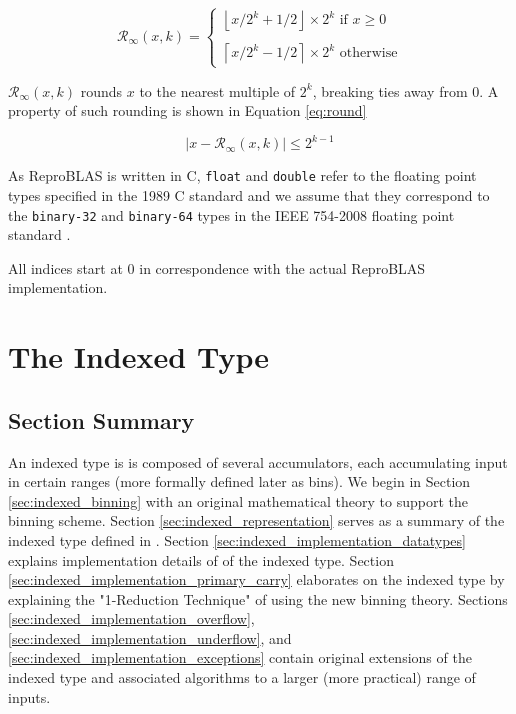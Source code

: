 \documentclass[12pt]{article}
\providecommand{\ceil}[1]{\left \lceil #1 \right \rceil }
\providecommand{\floor}[1]{\left \lfloor #1 \right \rfloor }
\providecommand{\roundtonearestinfty}{\ensuremath{\mathcal{R}_\text{$\infty$}}}
\theoremstyle{plain}
\numberwithin{equation}{section}
\begin{document}
  \begin{equation}
    \roundtonearestinfty(x, k) = \begin{cases}\floor{x/2^k + 1/2} \times 2^k \text{ if } x \geq 0\\ \\ \ceil{x/2^k - 1/2}\times 2^k \text{ otherwise}\end{cases}
  \end{equation}

  $\roundtonearestinfty(x, k)$ rounds $x$ to the nearest multiple of $2^k$, breaking ties away from 0. A property of such rounding is shown in Equation \ref{eq:round}

  \begin{equation}
    |x - \roundtonearestinfty(x, k)| \leq 2^{k - 1}
    \label{eq:round}
  \end{equation}

  As ReproBLAS is written in C, \verb|float| and \verb|double| refer to the floating point types specified in the 1989 C standard \cite{c89} and we assume that they correspond to the \verb|binary-32| and \verb|binary-64| types in the IEEE 754-2008 floating point standard \cite{ieee754}.

  All indices start at $0$ in correspondence with the actual ReproBLAS implementation.
\section{The Indexed Type}
  \subsection{Section Summary}
    An indexed type is is composed of several accumulators, each accumulating input in certain ranges (more formally defined later as bins). We begin in Section \ref{sec:indexed_binning} with an original mathematical theory to support the binning scheme. Section \ref{sec:indexed_representation} serves as a summary of the indexed type defined in \cite{repsum}.
    Section \ref{sec:indexed_implementation_datatypes} explains implementation details of \cite{repsum} of the indexed type. Section \ref{sec:indexed_implementation_primary_carry} elaborates on the indexed type by explaining the "1-Reduction Technique" of \cite{repsum} using the new binning theory.
    Sections \ref{sec:indexed_implementation_overflow}, \ref{sec:indexed_implementation_underflow}, and \ref{sec:indexed_implementation_exceptions} contain original extensions of the indexed type and associated algorithms to a larger (more practical) range of inputs.
\end{document}
